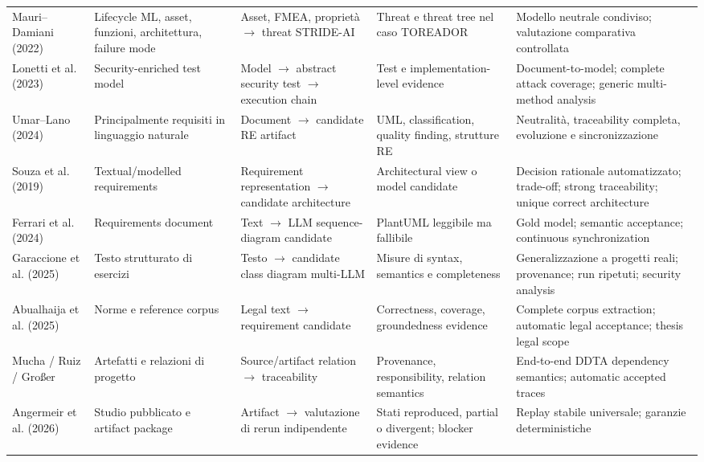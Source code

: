 \documentclass[12pt,a4paper,oneside]{report}
\begin{document}
\begin{longtable}{p{2.1cm} p{2.55cm} p{2.65cm} p{2.75cm} p{3.0cm}}
Mauri--Damiani (2022) & Lifecycle ML, asset, funzioni, architettura, failure mode & Asset, FMEA, proprietà $\rightarrow$ threat STRIDE-AI & Threat e threat tree nel caso TOREADOR & Modello neutrale condiviso; valutazione comparativa controllata \\

Lonetti et al. (2023) & Security-enriched test model & Model $\rightarrow$ abstract security test $\rightarrow$ execution chain & Test e implementation-level evidence & Document-to-model; complete attack coverage; generic multi-method analysis \\

Umar--Lano (2024) & Principalmente requisiti in linguaggio naturale & Document $\rightarrow$ candidate RE artifact & UML, classification, quality finding, strutture RE & Neutralità, traceability completa, evoluzione e sincronizzazione \\

Souza et al. (2019) & Textual/modelled requirements & Requirement representation $\rightarrow$ candidate architecture & Architectural view o model candidate & Decision rationale automatizzato; trade-off; strong traceability; unique correct architecture \\

Ferrari et al. (2024) & Requirements document & Text $\rightarrow$ LLM sequence-diagram candidate & PlantUML leggibile ma fallibile & Gold model; semantic acceptance; continuous synchronization \\

Garaccione et al. (2025) & Testo strutturato di esercizi & Testo $\rightarrow$ candidate class diagram multi-LLM & Misure di syntax, semantics e completeness & Generalizzazione a progetti reali; provenance; run ripetuti; security analysis \\

Abualhaija et al. (2025) & Norme e reference corpus & Legal text $\rightarrow$ requirement candidate & Correctness, coverage, groundedness evidence & Complete corpus extraction; automatic legal acceptance; thesis legal scope \\

Mucha / Ruiz / Gro{\ss}er & Artefatti e relazioni di progetto & Source/artifact relation $\rightarrow$ traceability & Provenance, responsibility, relation semantics & End-to-end DDTA dependency semantics; automatic accepted traces \\

Angermeir et al. (2026) & Studio pubblicato e artifact package & Artifact $\rightarrow$ valutazione di rerun indipendente & Stati reproduced, partial o divergent; blocker evidence & Replay stabile universale; garanzie deterministiche \\

\end{longtable}
\endgroup
\end{document}
